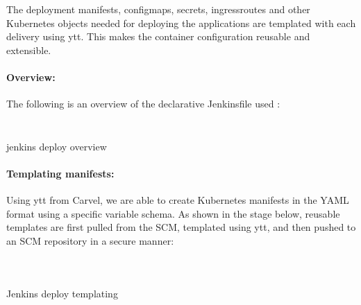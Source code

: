 
The deployment manifests, configmaps, secrets, ingressroutes and other Kubernetes objects needed for deploying the applications are templated with each delivery using ytt. This makes the container configuration reusable and extensible.  


\paragraph{Overview: }

The following is an overview of the declarative Jenkinsfile used : 

 
\begin{listing}[H]
    \inputminted[firstline=1,lastline=30]{Dockerfile}{codeListing/Jenkinsfile_deploy_overview}
\end{listing}
 
\begin{listing}[H]
    \inputminted[firstline=31]{Dockerfile}{codeListing/Jenkinsfile_deploy_overview}
    \caption{jenkins deploy overview}
    \label{lst:jenkinsfile_deploy_overview}
\end{listing}

\paragraph{Templating manifests: }

Using ytt from Carvel, we are able to create Kubernetes manifests in the YAML format using a specific variable schema. As shown in the stage below, reusable templates are first pulled from the SCM, templated using ytt, and then pushed to an SCM repository in a secure manner: 

 \begin{listing}[H]
    \inputminted[firstline=1,lastline=15]{Dockerfile}{codeListing/Jenkinsfile_deploy_templating}
\end{listing}

 \begin{listing}[H]
    \inputminted[firstline=16,lastline=49]{Dockerfile}{codeListing/Jenkinsfile_deploy_templating}
\end{listing}

 \begin{listing}[H]
    \inputminted[firstline=50]{Dockerfile}{codeListing/Jenkinsfile_deploy_templating}
    \caption{Jenkins deploy templating}
    \label{lst:jenkinsfile_deploy_templating}
\end{listing}



